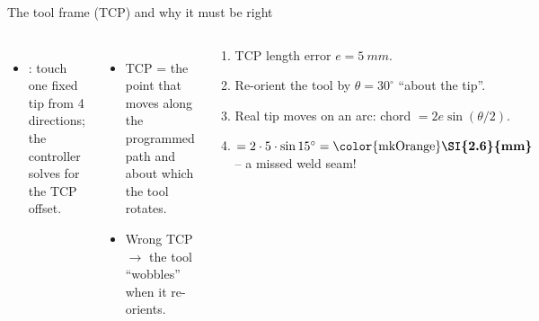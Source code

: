 \documentclass[aspectratio=169,10pt]{beamer}
\renewcommand{\hl}[1]{\text{\color{mkOrange}\bfseries #1}}
\begin{document}
\begin{frame}[t]{The tool frame (TCP) and why it must be right}
\begin{columns}[T,onlytextwidth]
\centering
{}
\begin{itemize}\small
\item {}: touch one fixed tip from 4 directions; the controller solves for the TCP offset.
\end{itemize}
\begin{itemize}\small
\item TCP = the point that moves along the programmed path and about which the tool rotates.
\item Wrong TCP $\to$ the tool ``wobbles'' when it re-orients.
\end{itemize}
\begin{defbox}
\footnotesize
\begin{enumerate}
\item TCP length error $e = \SI{5}{mm}$.
\item Re-orient the tool by $\theta = 30^\circ$ ``about the tip''.
\item Real tip moves on an arc: chord $= 2e\sin(\theta/2)$.
\item $= 2\cdot 5\cdot\sin 15^\circ = \hl{\SI{2.6}{mm}}$ -- a missed weld seam!
\end{enumerate}
\end{defbox}
\end{columns}
\end{frame}
\end{document}
